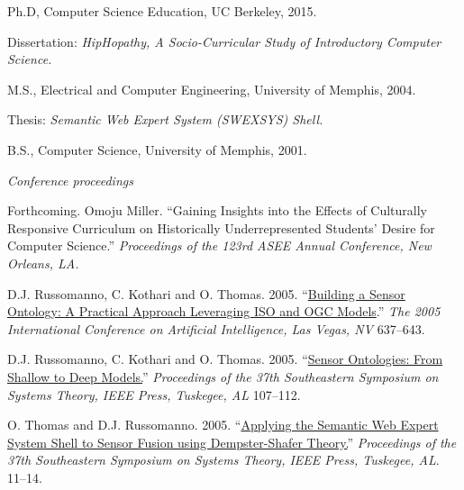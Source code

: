 \documentclass[11pt,article,oneside]{memoir}
\begin{document}
\ind Ph.D, Computer Science Education, UC Berkeley, 2015.

\ind \hspace{0.35in} \footnotesize Dissertation: \emph{HipHopathy, A Socio-Curricular Study of Introductory Computer Science.} \normalsize \vspace{0.05in}

\ind M.S., Electrical and Computer Engineering, University of Memphis, 2004. 

\ind \hspace{0.35in} \footnotesize Thesis: \emph{Semantic Web Expert System (SWEXSYS) Shell.} \normalsize \vspace{0.01in}

\ind B.S., Computer Science, University of Memphis, 2001.
\bigskip 


\medskip

\noindent\emph{Conference proceedings \vspace{0.05in}}
 

\ind Forthcoming. Omoju Miller. ``Gaining Insights into the Effects of Culturally Responsive Curriculum on Historically Underrepresented Students' Desire for Computer Science.'' \emph{Proceedings of the 123rd ASEE Annual Conference, New Orleans, LA.}

\ind D.J. Russomanno, C. Kothari and O. Thomas. 2005. ``\href{https://scholar.google.com/citations?view_op=view_citation&hl=en&user=E7z_wrwAAAAJ&sortby=pubdate&citation_for_view=E7z_wrwAAAAJ:u5HHmVD_uO8C}{Building a Sensor Ontology: A Practical Approach Leveraging ISO and OGC Models}.'' \emph{The 2005 International Conference on Artificial Intelligence, Las Vegas, NV} 637--643. 

\ind D.J. Russomanno, C. Kothari and O. Thomas. 2005. ``\href{http://scholar.google.com/citations?view_op=view_citation&hl=en&user=E7z_wrwAAAAJ&citation_for_view=E7z_wrwAAAAJ:u-x6o8ySG0sC}{Sensor Ontologies: From Shallow to Deep Models.}'' \emph{Proceedings of the 37th Southeastern Symposium on Systems Theory, IEEE Press, Tuskegee, AL} 107--112. 

\ind O. Thomas and D.J. Russomanno. 2005. ``\href{http://scholar.google.com/citations?view_op=view_citation&hl=en&user=E7z_wrwAAAAJ&citation_for_view=E7z_wrwAAAAJ:d1gkVwhDpl0C}{Applying the Semantic Web Expert System Shell to Sensor Fusion using Dempster-Shafer Theory.}'' \emph{Proceedings of the 37th Southeastern Symposium on Systems Theory, IEEE Press, Tuskegee, AL}. 11--14.
\end{document}

